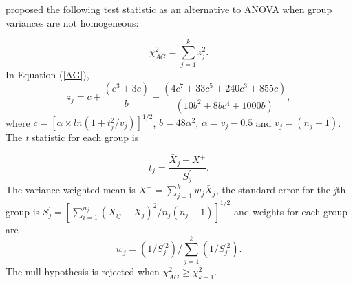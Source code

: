 \citet{alexander1994} proposed the following test statistic as an alternative to ANOVA when group variances are not homogeneous:

\begin{equation}\label{AG}
\chi_{AG}^2 = \sum_{j=1}^{k} z_j^2.
\end{equation}
In Equation (\ref{AG}), 
\begin{equation*}
z_j = c+\frac{(c^3+3c)}{b}-\frac{(4c^7+33c^5+240c^3+855c)}{(10b^2+8bc^4+1000b)},
\end{equation*}
where $c=[\alpha \times ln (1+t_j^2/v_j)] ^{1/2}$, $b=48\alpha^2$, $\alpha =v_j-0.5$ and $v_j = (n_j - 1)$. The \textit{t} statistic for each group is

\begin{equation}\label{t}
t_j=\frac{\bar{X}_{j}-X^+}{S_j^{'}}.
\end{equation}
The variance-weighted mean is $X^+=\sum_{j=1}^{k}w_j\bar{X}_{j}$, the standard error for the \textit{j}th group is
\begin{math}
S_j^{'}=\left[{\sum_{i=1}^{n_j}(X_{ij}-\bar{X}_{j})^2}/{n_j (n_j-1)}\right]^{1/2}
\end{math}
and weights for each group are 
\begin{equation}\label{eq:wj}
{w}_{j}={(1/S_j^{'2})/}{\sum_{j=1}^{k}(1/S_j^{'2})}. \end{equation}
The null hypothesis is rejected when \begin{math} \chi_{AG}^2 \geqslant \chi_{k-1}^2 \end{math}.

